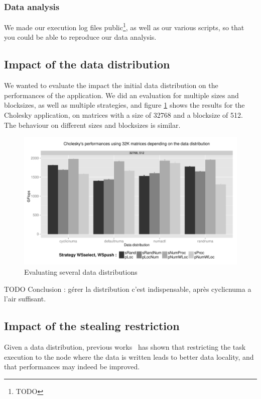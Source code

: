 \documentclass{Styles/llncs}
\begin{document}
\subsubsection{Data analysis}
We made our execution log files public\footnote{TODO}, as well as our various scripts, so that
you could be able to reproduce our data analysis.

\subsection{Impact of the data distribution}

We wanted to evaluate the impact the initial data distribution on the performances
of the application. We did an evaluation for multiple sizes and blocksizes,
as well as multiple strategies, and figure \ref{fig:eval-distrib} shows the
results for the Cholesky application, on matrices with a size
of 32768 and a blocksize of 512. The behaviour on different sizes and blocksizes is
similar.


\begin{figure}[t]
  \centering
  \includegraphics[scale=0.5]{figures/graph_distrib.pdf}
\caption{Evaluating several data distributions}
\label{fig:eval-distrib}
\end{figure}


TODO Conclusion : gérer la distribution c'est indispensable, après cyclicnuma a l'air suffisant.


\subsection{Impact of the stealing restriction}

Given a data distribution, previous works~\cite{Olivier:2012:CMW:2388996.2389085}
has shown that restricting the task execution to the node where the data is
written leads to better data locality, and that performances may indeed be improved.
\end{document}
